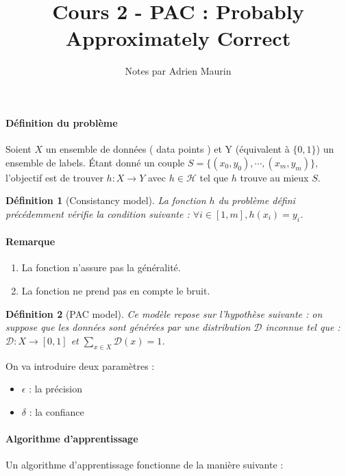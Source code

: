 \documentclass{article}
\newtheorem{definition}{Définition}
\begin{document}
\title{Cours 2 - PAC : Probably Approximately Correct}
\author{Notes par Adrien Maurin}
\date{}

\maketitle

\paragraph{Définition du problème} Soient $X$ un ensemble de données (\og{} data points \fg) et Y (équivalent à $\{0, 1\}$) un ensemble de labels. \'Etant donné un couple $S = \{(x_0, y_0), \cdots , (x_m, y_m)\}$, l'objectif est de trouver $h : X \to Y$ avec $h \in \mathcal{H}$ tel que $h$ trouve au mieux $S$.

\begin{definition}[Consistancy model]
  La fonction $h$ du problème défini précédemment vérifie la condition suivante : $\forall i \in [1, m], h(x_i) = y_i$.
\end{definition}

\paragraph{Remarque}
  \begin{enumerate}
    \item La fonction n'assure pas la généralité.
    \item La fonction ne prend pas en compte le bruit.
  \end{enumerate}

\begin{definition}[PAC model]
  Ce modèle repose sur l'hypothèse suivante : on suppose que les données sont générées par une distribution $\mathcal{D}$ inconnue tel que : $\mathcal{D} : X \longrightarrow [0, 1]$ et $\sum_{x \in X} \mathcal{D}(x) = 1$.
\end{definition}


On va introduire deux paramètres :

\begin{itemize}
  \item $\epsilon$ : la précision
  \item $\delta$ : la confiance
\end{itemize}

\paragraph{Algorithme d'apprentissage}
Un algorithme d'apprentissage fonctionne de la manière suivante :
\end{document}
